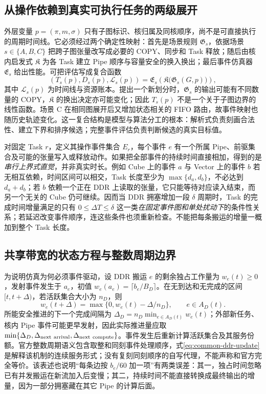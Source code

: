 \subsection{从操作依赖到真实可执行任务的两级展开}
外层变量 $p=(\pi,m,\sigma)$ 只有子图标识、核归属及同核顺序，尚不是可直接执行的周期时间线。它必须经过两个确定性映射：首先是场景规则 $\mathfrak G_s$，依据场景 $s\in\{A,B,C\}$ 把跨子图张量改写成必要的 COPY、同步和 Task 释放；随后由核内启发式 $\mathfrak K$ 为各 Task 建立 Pipe 顺序与容量安全的换入换出；最后事件仿真器 $\mathfrak E_s$ 给出性能。可把评估写成复合函数
\begin{equation}\label{eq:composition-model}
(T_s(p),D_s(p),\mathcal L_s(p))
=\mathfrak E_s\!\left(\mathfrak K\bigl(\mathfrak G_s(G,p)\bigr)\right),
\end{equation}
其中 $\mathcal L_s(p)$ 为时间线与资源账本。提出一个新划分时，$\mathfrak G_s$ 的输出可能有不同数量的 COPY，$\mathfrak K$ 的换出决定亦可能变化；因此 $T_s(p)$ 不是一个关于子图边界的线性函数。场景 C 在相同图展开后又增加状态相关的 FIFO 路由，故事件映射也随历史轨迹变化。这一复合结构是模型与算法分工的根本：解析式负责刻画合法性、建立下界和排序候选；完整事件评估负责判断候选的真实目标值。

对固定 Task $r$，定义其操作事件集合 $E_r$，每个事件 $e$ 有一个所属 Pipe、前驱集合及可能的张量写入或释放动作。如果把全部事件的持续时间直接相加，得到的是\emph{串行上界式直觉}，并非真实时长。例如 Cube 上的事件 $a$ 与 Vector 上的事件 $b$ 若无相互依赖，时间区间可以相交，Task 长度至少为 $\max\{d_a,d_b\}$，不必达到 $d_a+d_b$；若 $b$ 依赖一个正在 DDR 上读取的张量，它只能等待对应读入结束，而另一个无关的 Cube 仍可继续。因而当 DDR 拥塞增加一段 $\delta$ 周期时，Task 的完成时间增量满足的只有 $0\le \Delta T\le\delta$ 这一类\emph{在固定事件图和单处扰动下}的条件性关系；若延迟改变事件顺序，连这些条件也须重新检查。不能把每条搬运的增量一概加到整个 Task 长度。

\subsection{共享带宽的状态方程与整数周期边界}
为说明仿真为何必须事件驱动，设 DDR 搬运 $e$ 的剩余独占工作量为 $w_e(t)\ge0$，发射事件发生于 $a_e$，初值 $w_e(a_e)=\lceil b_e/B_D\rceil$。在无到达和无完成的区间 $[t,t+\Delta)$，若活跃集合大小为 $n_D$，则
\begin{equation}\label{eq:common-ddr-update}
w_e(t+\Delta)=\max\{0,w_e(t)-\Delta/n_D\},
\qquad e\in A_D(t).
\end{equation}
所能安全推进的下一个完成间隔为 $\Delta_D=n_D\min_{e\in A_D(t)}w_e(t)$；外部新任务、核内 Pipe 事件可能更早发射，因此实际推进量应取 $\min\{\Delta_D,\Delta_{\rm next\ arrival},\Delta_{\rm next\ compute}\}$。事件发生后重新计算活跃集合及其服务份额。官方整数周期语义包含取整和同刻事件处理顺序，式\eqref{eq:common-ddr-update}是解释该机制的连续服务形式；没有复刻同刻顺序的自写代理，不能声称和官方完全等价。该表述也说明“每条边按 $b_e/60$ 加一项”有两类误差：其一，独占时间忽略已有并发搬运在新流加入后变慢；其二，持续时间不能直接转换成最终输出的增量，因为一部分拥塞藏在其它 Pipe 的计算后面。

